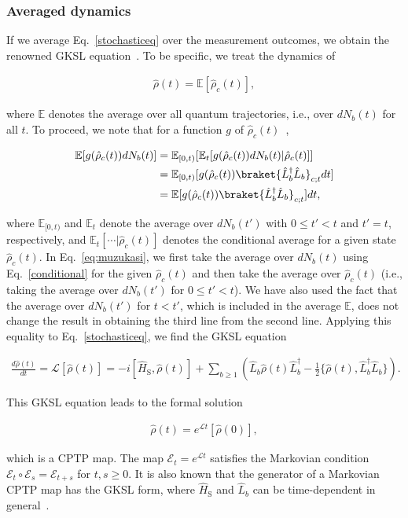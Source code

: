 \documentclass[preprint,pteplogo]{ptephy_v2}%
\numberwithin{equation}{section}
\theoremstyle{definition}
\newcommand{\ml}[1]{\mathcal{#1}}
\newcommand{\mr}[1]{\mathrm{#1}}
\newcommand{\mbb}[1]{\mathbb{#1}}
\newcommand{\aln}[1]{
\begin{align}
#1
\end{align}
}
\begin{document}
\subsubsection{Averaged dynamics} \label{sec:AveragedDynamics}
If we average Eq.~\eqref{stochasticeq} over the measurement outcomes, we obtain the renowned GKSL equation~\cite{lindblad1976generators, gorini1976completely}.
To be specific, we treat the dynamics of
\aln{
\hat{\rho}(t)=\mbb{E}[\hat{\rho}_c(t)],
}
where $\mbb{E}$ denotes the average over all quantum trajectories, i.e., over $dN_b(t)$ for all $t$.
To proceed, we note that for a function $g$ of $\hat{\rho}_c(t)$~\cite{landi2024current},
\aln{\label{eq:muzukasi}
\mbb{E}[g(\hat{\rho}_c(t))dN_b(t)]&=\mbb{E}_{[0,t)}[\mbb{E}_{t}[g(\hat{\rho}_c(t))dN_b(t)|\hat{\rho}_c(t)]]\nonumber\\
&=\mbb{E}_{[0,t)}[g(\hat{\rho}_c(t))\braket{\hat{L}_b^\dag\hat{L}_b}_{c;t}dt]\nonumber\\
&=\mbb{E}[g(\hat{\rho}_c(t))\braket{\hat{L}_b^\dag\hat{L}_b}_{c;t}]dt,
}
where $\mbb{E}_{[0,t)}$ and $\mbb{E}_t$ denote the average over $dN_b(t')$ with $0\leq t'<t$ and $t'=t$, respectively, and $\mathbb{E}_{t}[\cdots|\hat{\rho}_c(t)]$ denotes the conditional average for a given state $\hat{\rho}_c(t)$. 
In Eq.~\eqref{eq:muzukasi}, we first take the average over $dN_b(t)$ using Eq.~\eqref{conditional} for the given $\hat{\rho}_c(t)$ and then take the average over $\hat{\rho}_c(t)$ (i.e., taking the average over $dN_b(t')$ for $0\leq t'<t$).
We have also used the fact that the average over $dN_b(t')$ for $t< t'$, which is included in the average $\mbb{E}$, does not change the result in obtaining the third line from the second line.
Applying this equality to Eq.~\eqref{stochasticeq}, we find the GKSL equation
\aln{
\frac{d\hat{\rho}(t)}{dt}=\ml{L}[\hat{\rho}(t)]=-i[\hat{H}_\mr{S},\hat{\rho}(t)]+\sum_{b\geq 1}\left(\hat{L}_b\hat{\rho}(t)\hat{L}_b^\dag-\frac{1}{2}\{\hat{\rho}(t),\hat{L}_b^\dag\hat{L}_b\}\right).
}
This GKSL equation leads to the formal solution 
\aln{\label{formalGKSL}
\hat{\rho}(t)=e^{\ml{L}t}[\hat{\rho}(0)],
}
which is a CPTP map.
The map $\ml{E}_t=e^{\ml{L}t}$ satisfies the Markovian condition $\ml{E}_t\circ\ml{E}_s=\ml{E}_{t+s}$ for $t,s\geq 0$.
It is also known that the generator of a Markovian CPTP map has the GKSL form, where $\hat{H}_\mr{S}$ and $\hat{L}_b$ can be time-dependent in general~\cite{lindblad1976generators, rivas2012open}.
\end{document}
